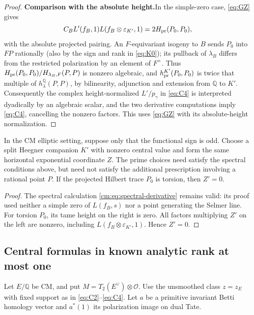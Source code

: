 \begin{proof}
\par\smallskip\noindent\textbf{Comparison with the absolute height.}\enspace In the simple-zero case, \eqref{eq:GZ} gives
\[
 C_B L'(f_B,1)L(f_B\otimes\varepsilon_{K'},1)
       =2H_{\rm pr}(P_0,P_0),
\]
with the absolute projected pairing. An \(F\)-equivariant isogeny to \(B\) sends \(P_0\) into \(F P\) rationally
(also by the sign and rank in \eqref{eq:K0}); its pullback of \(\lambda_B\) differs from the
restricted polarization by an element of \(F^\times\). Thus \(H_{\rm
pr}(P_0,P_0)/H_{\lambda_B,F}(P,P)\) is nonzero algebraic, and \(h_{\rm pr}^{K'}(P_0,P_0)\) is
twice that multiple of \(h_\lambda^\mathbb Q(P,P)\), by bilinearity, adjunction and extension
from \(\mathbb Q\) to \(K'\). Consequently the complex height-normalized \(L'/p_\gamma\) in
\eqref{eq:C4} is interpreted dyadically by an algebraic scalar, and the two derivative
computations imply \eqref{eq:C4}, cancelling the nonzero factors. This uses \eqref{eq:GZ} with
its absolute-height normalization.
\end{proof}

\begin{corollary}\label{cm:torsion-trace}
In the CM elliptic setting, suppose only that the functional sign is
odd. Choose a split Heegner companion \(K'\) with nonzero central
value and form the same horizontal exponential coordinate \(Z\).
The prime choices need satisfy the spectral conditions above, but
need not satisfy the additional prescription involving a rational
point \(P\). If the projected Hilbert trace \(P_0\) is torsion,
then \(Z'=0\).
\end{corollary}

\begin{proof}
The spectral calculation \eqref{cm:eq:spectral-derivative} remains
valid: its proof used neither a simple zero of \(L(f_B,s)\) nor a
point generating the Selmer line.
For torsion \(P_0\), its tame height on the right is zero.
All factors multiplying \(Z'\) on the left are nonzero, including
\(L(f_B\otimes\varepsilon_{K'},1)\). Hence \(Z'=0\).
\end{proof} 


\subsection{Central formulas in known analytic rank at most one}

Let \(E/\mathbb Q\) be CM, and put
\(M=T_2(E^\vee)\otimes\mathcal O\).
Use the unsmoothed class \(z=z_E\) with fixed support as in
\eqref{eq:C2}--\eqref{eq:C4}.
Let \(a\) be a primitive invariant Betti homology vector and
\(a^*(1)\) its polarization image on dual Tate.


